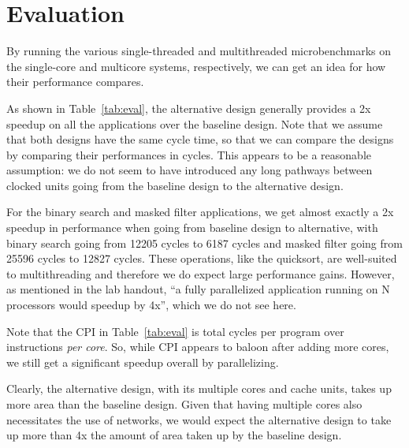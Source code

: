 \documentclass[10pt]{article}
\begin{document}
\section{Evaluation}

By running the various single-threaded and multithreaded microbenchmarks on the single-core and multicore systems, respectively, we can get an idea for how their performance compares. 

As shown in Table~\ref{tab:eval}, the alternative design generally provides a 2x speedup on all the applications over the baseline design. Note that we assume that both designs have the same cycle time, so that we can compare the designs by comparing their performances in cycles. This appears to be a reasonable assumption: we do not seem to have introduced any long pathways between clocked units going from the baseline design to the alternative design.

For the binary search and masked filter applications, we get almost exactly a 2x speedup in performance when going from baseline design to alternative, with binary search going from 12205 cycles to 6187 cycles and masked filter going from 25596 cycles to 12827 cycles. These operations, like the quicksort, are well-suited to multithreading and therefore we do expect large performance gains. However, as mentioned in the lab handout, ``a fully parallelized application running on N
processors would speedup by 4x'', which we do not see here.


Note that the CPI in Table~\ref{tab:eval} is total cycles per program over instructions \textit{per core}. So, while CPI appears to baloon after adding more cores, we still get a significant speedup overall by parallelizing.

Clearly, the alternative design, with its multiple cores and cache units, takes up more area than the baseline design. Given that having multiple cores also necessitates the use of networks, we would expect the alternative design to take up more than 4x the amount of area taken up by the baseline design.
\end{document}
